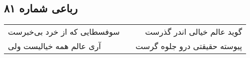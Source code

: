 \begin{center}
\section*{رباعی شماره ۸۱}
\label{sec:sh081}
\begin{longtable}{l p{0.5cm} r}
سوفسطایی که از خرد بی‌خبرست
&&
گوید عالم خیالی اندر گذرست
\\
آری عالم همه خیالیست ولی
&&
پیوسته حقیقتی درو جلوه گرست
\\
\end{longtable}
\end{center}
